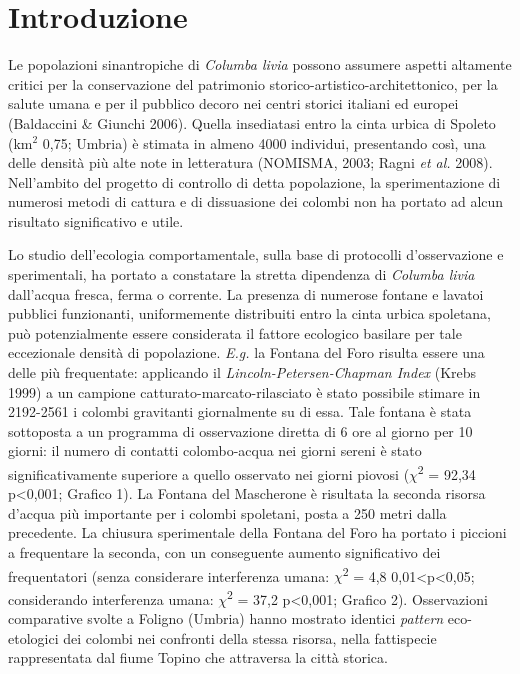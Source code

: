 \section*{Introduzione}

Le popolazioni sinantropiche di \textit{Columba livia }possono assumere
aspetti altamente critici per la conservazione del patrimonio
storico-artistico-architettonico, per la salute umana e per il pubblico
decoro nei centri storici italiani ed europei (Baldaccini \& Giunchi
2006). Quella insediatasi entro la cinta urbica di Spoleto (km$^2$ 0,75;
Umbria) \`e stimata in almeno 4000 individui, presentando cos\`i, una
delle densit\`a pi\`u alte note in letteratura (NOMISMA, 2003; Ragni
\textit{et al.} 2008). Nell{\textquoteright}ambito del progetto di
controllo di detta popolazione, la sperimentazione di numerosi metodi
di cattura e di dissuasione dei colombi non ha portato ad alcun
risultato significativo e utile. 

Lo studio dell{\textquoteright}ecologia comportamentale, sulla base di
protocolli d{\textquoteright}osservazione e sperimentali, ha portato a
constatare la stretta dipendenza di \textit{Columba livia
}dall{\textquoteright}acqua fresca, ferma o corrente. La presenza di
numerose fontane e lavatoi pubblici funzionanti, uniformemente
distribuiti entro la cinta urbica spoletana, pu\`o potenzialmente
essere considerata il fattore ecologico basilare per tale eccezionale
densit\`a di popolazione. \textit{E.g.} la Fontana del Foro risulta
essere una delle pi\`u frequentate: applicando il
\textit{Lincoln-Petersen-Chapman Index }(Krebs 1999) a un campione
catturato-marcato-rilasciato \`e stato possibile stimare in 2192-2561 i
colombi gravitanti giornalmente su di essa. Tale fontana \`e stata
sottoposta a un programma di osservazione diretta di 6 ore al giorno
per 10 giorni: il numero di contatti colombo-acqua nei giorni sereni
\`e stato significativamente superiore a quello osservato nei giorni
piovosi (${\chi}$\textsuperscript{2} = 92,34  p{\textless}0,001;
Grafico 1). La Fontana del Mascherone \`e risultata la seconda risorsa
d{\textquoteright}acqua pi\`u importante per i colombi spoletani, posta
a 250 metri dalla precedente. La chiusura sperimentale della Fontana
del Foro ha portato i piccioni a frequentare la seconda, con un
conseguente aumento significativo dei frequentatori (senza considerare
interferenza umana: ${\chi}$\textsuperscript{2} = 4,8 
0,01{\textless}p{\textless}0,05; considerando interferenza umana:
${\chi}$\textsuperscript{2} = 37,2 p{\textless}0,001; Grafico 2).
Osservazioni comparative svolte a Foligno (Umbria) hanno mostrato
identici \textit{pattern }eco-etologici dei colombi nei confronti della
stessa risorsa, nella fattispecie rappresentata dal fiume Topino che
attraversa la citt\`a storica. 

